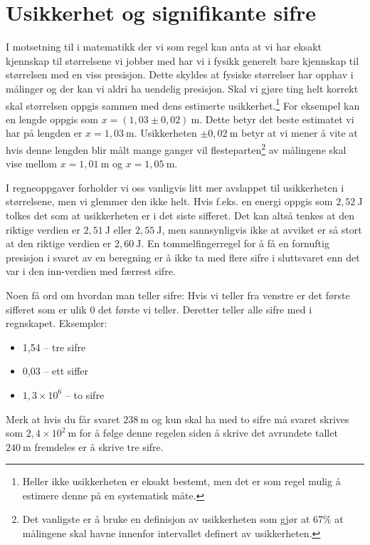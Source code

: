 \chapter{Usikkerhet og signifikante sifre}
I motsetning til i matematikk der vi som regel kan anta at vi har eksakt kjennskap til størrelsene vi jobber med har vi i fysikk generelt bare kjennskap til størrelsen med en viss presisjon. Dette skyldes at fysiske størrelser har opphav i målinger og der kan vi aldri ha uendelig presisjon. Skal vi gjøre ting helt korrekt skal størrelsen oppgis sammen med dens estimerte usikkerhet.\footnote{Heller ikke usikkerheten er eksakt bestemt, men det er som regel mulig å estimere denne på en systematisk måte.
} For eksempel kan en lengde oppgis som $x=(1,03\pm0,02)~\mathrm{m}$. Dette betyr det beste estimatet vi har på lengden er $x = 1,03~\mathrm{m}$. Usikkerheten $\pm0,02~\mathrm{m}$ betyr at vi mener å vite at hvis denne lengden blir målt mange ganger vil flesteparten\footnote{Det vanligste er å bruke en definisjon av usikkerheten som gjør at 67\% at målingene skal havne innenfor intervallet definert av usikkerheten.} av målingene skal vise mellom $x=1,01~\mathrm{m}$ og $x=1,05~\mathrm{m}$. 

I regneoppgaver forholder vi oss vanligvis litt mer avslappet til usikkerheten i størrelsene, men vi glemmer den ikke helt. Hvis f.eks. en energi oppgis som $2,52~\mathrm{J}$ tolkes det som at usikkerheten er i det siste sifferet. Det kan altså tenkes at den riktige verdien er $2,51~\mathrm{J}$ eller $2,55~\mathrm{J}$, men sannsynligvis ikke at avviket er så stort at den riktige verdien er $2,60~\mathrm{J}$. En tommelfingerregel for å få en fornuftig presisjon i svaret av en beregning er å ikke ta med flere sifre i sluttsvaret enn det var i den inn-verdien med færrest sifre.

Noen få ord om hvordan man teller sifre: Hvis vi teller fra venstre er det første sifferet som er ulik 0 det første vi teller. Deretter teller alle sifre med i regnskapet. Eksempler:
\begin{itemize}
	\item 1,54 -- tre sifre
	\item 0,03 -- ett siffer
	\item$1,3\times10^6$ -- to sifre
\end{itemize}
Merk at hvis du får svaret $238~\mathrm{m}$ og kun skal ha med to sifre må svaret skrives som $2,4\times10^2~\mathrm{m}$ for å følge denne regelen siden å skrive det avrundete tallet $240~\mathrm{m}$ fremdeles er å skrive tre sifre.


